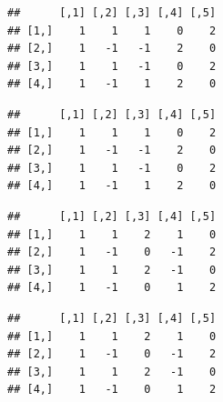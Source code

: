 \documentclass[12pt,]{article}
\newenvironment{Shaded}{\begin{snugshade}}{\end{snugshade}}
\newcommand{\KeywordTok}[1]{\textcolor[rgb]{0.13,0.29,0.53}{\textbf{#1}}}
\newcommand{\StringTok}[1]{\textcolor[rgb]{0.31,0.60,0.02}{#1}}
\newcommand{\OperatorTok}[1]{\textcolor[rgb]{0.81,0.36,0.00}{\textbf{#1}}}
\newcommand{\NormalTok}[1]{#1}
\begin{document}
\begin{Shaded}
\end{Shaded}

\begin{verbatim}
##      [,1] [,2] [,3] [,4] [,5]
## [1,]    1    1    1    0    2
## [2,]    1   -1   -1    2    0
## [3,]    1    1   -1    0    2
## [4,]    1   -1    1    2    0
\end{verbatim}

\begin{Shaded}
\end{Shaded}

\begin{verbatim}
##      [,1] [,2] [,3] [,4] [,5]
## [1,]    1    1    1    0    2
## [2,]    1   -1   -1    2    0
## [3,]    1    1   -1    0    2
## [4,]    1   -1    1    2    0
\end{verbatim}

\begin{Shaded}
\end{Shaded}

\begin{verbatim}
##      [,1] [,2] [,3] [,4] [,5]
## [1,]    1    1    2    1    0
## [2,]    1   -1    0   -1    2
## [3,]    1    1    2   -1    0
## [4,]    1   -1    0    1    2
\end{verbatim}

\begin{Shaded}
\end{Shaded}

\begin{verbatim}
##      [,1] [,2] [,3] [,4] [,5]
## [1,]    1    1    2    1    0
## [2,]    1   -1    0   -1    2
## [3,]    1    1    2   -1    0
## [4,]    1   -1    0    1    2
\end{verbatim}
\end{document}
